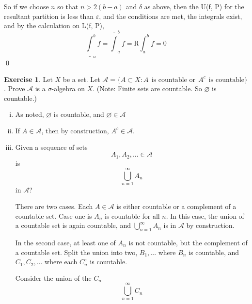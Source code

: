 \documentclass[11pt,oneside]{article}
\numberwithin{equation}{section}
\theoremstyle{definition}
\newtheorem{exercise}{Exercise}
\def\calA{\mathcal{A}}
\begin{document}
\begin{solution}
  So if we choose $n$ so that $n > 2(b-a)$ and $\delta$ as above, then the U(f, P) for the resultant partition is less than $\varepsilon$, and the conditions are met,
  the integrals exist, and by the calculation on L(f, P),
  $$
  \underline \int _a ^b f = \overline \int _a ^b f = \text{R} \int _a ^b f = 0
  $$
  \qed
  
\end{solution}

\begin{exercise}
  Let $X$ be a set. Let $ \calA = \{A \subset X : A \ \ \text{is 
    countable or} \ \ A^c \ \ \text{is countable} \}$.  Prove $\calA$ is a
    $\sigma$-algebra on $X$. (Note: Finite sets are countable. So
    $\varnothing$ is countable.)
\end{exercise}
\begin{solution}
  \begin{enumerate}[(i)]
    \item
      As noted, $\varnothing $ is countable, and $\varnothing \in \calA$
    \item
      If $A \in \calA$, then by construction, $A^c \in \calA$.
    \item
      Given a sequence of sets
      $$
      A_1, A_2, ... \in \calA
      $$
      is
      $$ \bigcup _ {n =1} ^ \infty A_n
      $$ in $\calA$?

      There are two cases.  Each $A \in \calA$ is either countable or
      a complement of a countable set.  Case one is $A_n$ is countable
      for all $n$.  In this case, the union of a countable set is again countable, and
      $ \bigcup _ {n =1} ^ \infty A_n $ is in $\calA$ by construction.

      In the second case, at least one of $A_n$ is not countable, but
      the complement of a countable set.  Split the union into two,
      $B_1, ... $ where $B_n$ is countable, and $C_1, C_2,...$ where
      each $C_n^c$ is countable.

      Consider the union of the $C_n$
      $$
      \bigcup _ {n=1}^\infty C_n
      $$


\end{enumerate}
\end{solution}
\end{document}
